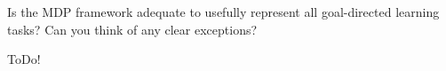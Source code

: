 
\begin{exercise}[Exercise 3.2]

Is the MDP framework adequate to usefully represent all goal-directed learning tasks?
Can you think of any clear exceptions?

\end{exercise}


\begin{solution}

ToDo!

\end{solution}

